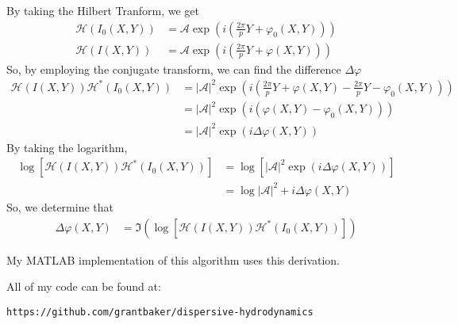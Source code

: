 \documentclass[11pt]{article}
\begin{document}
By taking the Hilbert Tranform, we get
\begin{align*}
  \mathcal{H}\left(I_0(X,Y)\right) &= \mathcal{A} \exp\left( i\left( \frac{2\pi}{p} Y + \varphi_0(X,Y)\right)\right)\\
  \mathcal{H}\left(I(X,Y)\right) &= \mathcal{A} \exp\left( i\left( \frac{2\pi}{p} Y + \varphi(X,Y)\right)\right)
\end{align*}
So, by employing the conjugate transform, we can find the difference $\Delta \varphi$
\begin{align*}
  \mathcal{H}(I(X,Y))\mathcal{H}^{*}(I_0(X,Y)) &= |\mathcal{A}|^2 \exp\left( i\left( \frac{2\pi}{p} Y + \varphi(X,Y) - \frac{2\pi}{p} Y - \varphi_0(X,Y)\right)\right)\\
  &= |\mathcal{A}|^2 \exp\left( i\left( \varphi(X,Y) - \varphi_0(X,Y)\right)\right)\\
  &= |\mathcal{A}|^2 \exp\left( i\Delta\varphi(X,Y)\right)
\end{align*}
By taking the logarithm,
\begin{align*}
  \log \left[\mathcal{H}(I(X,Y))\mathcal{H}^{*}(I_0(X,Y)) \right] &= \log
  \left[|\mathcal{A}|^2 \exp\left( i\Delta\varphi(X,Y)\right)\right]\\
  &= \log |\mathcal{A}|^2 + i\Delta \varphi(X,Y)
\end{align*}
So, we determine that
\begin{align*}
  \Delta \varphi (X,Y) &= \Im\left(\log \left[\mathcal{H}(I(X,Y))\mathcal{H}^{*}(I_0(X,Y)) \right]\right)
\end{align*}

My MATLAB implementation of this algorithm uses this derivation.

All of my code can be found at:

\texttt{https://github.com/grantbaker/dispersive-hydrodynamics}
\end{document}
